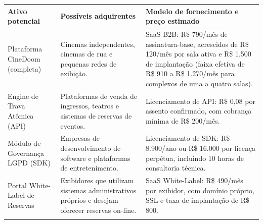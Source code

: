 {\footnotesize
\begin{tabularx}{\textwidth}{>{\hsize=0.523\hsize\sloppy\arraybackslash}X >{\hsize=0.966\hsize\sloppy\arraybackslash}X >{\hsize=1.511\hsize\sloppy\arraybackslash}X}
\arrayrulecolor{GithubTableBorder}\toprule
\rowcolor{BrandTableHeader}
\textbf{Ativo potencial} & \textbf{Possíveis adquirentes} & \textbf{Modelo de fornecimento e preço estimado} \\
\midrule
\arrayrulecolor{BrandGrayRule}
Plataforma CineDoom (completa) & Cinemas independentes, cinemas de rua e pequenas redes de exibição. & SaaS B2B: R\$ 790/mês de assinatura-base, acrescidos de R\$ 120/mês por sala ativa e R\$ 1.500 de implantação (faixa efetiva de R\$ 910 a R\$ 1.270/mês para complexos de uma a quatro salas). \\
\midrule
Engine de Trava Atômica (API) & Plataformas de venda de ingressos, teatros e sistemas de reservas de eventos. & Licenciamento de API: R\$ 0,08 por assento confirmado, com cobrança mínima de R\$ 200/mês. \\
\midrule
Módulo de Governança LGPD (SDK) & Empresas de desenvolvimento de software e plataformas de entretenimento. & Licenciamento de SDK: R\$ 8.900/ano ou R\$ 16.000 por licença perpétua, incluindo 10 horas de consultoria técnica. \\
\midrule
Portal White-Label de Reservas & Exibidores que utilizam sistemas administrativos próprios e desejam oferecer reservas on-line. & SaaS White-Label: R\$ 490/mês por exibidor, com domínio próprio, SSL e taxa de implantação de R\$ 800. \\
\arrayrulecolor{GithubTableBorder}\bottomrule
\end{tabularx}%
}
